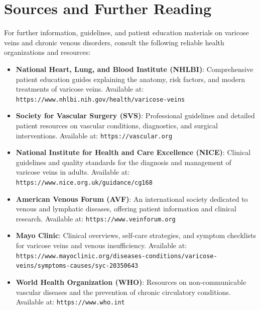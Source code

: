 \section*{Sources and Further Reading}
For further information, guidelines, and patient education materials on varicose veins and chronic venous disorders, consult the following reliable health organizations and resources:
\begin{itemize}
\item \textbf{National Heart, Lung, and Blood Institute (NHLBI)}: Comprehensive patient education guides explaining the anatomy, risk factors, and modern treatments of varicose veins. Available at: \texttt{https://www.nhlbi.nih.gov/health/varicose-veins}
\item \textbf{Society for Vascular Surgery (SVS)}: Professional guidelines and detailed patient resources on vascular conditions, diagnostics, and surgical interventions. Available at: \texttt{https://vascular.org}
\item \textbf{National Institute for Health and Care Excellence (NICE)}: Clinical guidelines and quality standards for the diagnosis and management of varicose veins in adults. Available at: \texttt{https://www.nice.org.uk/guidance/cg168}
\item \textbf{American Venous Forum (AVF)}: An international society dedicated to venous and lymphatic diseases, offering patient information and clinical research. Available at: \texttt{https://www.veinforum.org}
\item \textbf{Mayo Clinic}: Clinical overviews, self-care strategies, and symptom checklists for varicose veins and venous insufficiency. Available at: \texttt{https://www.mayoclinic.org/diseases-conditions/varicose-veins/symptoms-causes/syc-20350643}
\item \textbf{World Health Organization (WHO)}: Resources on non-communicable vascular diseases and the prevention of chronic circulatory conditions. Available at: \texttt{https://www.who.int}
\end{itemize}